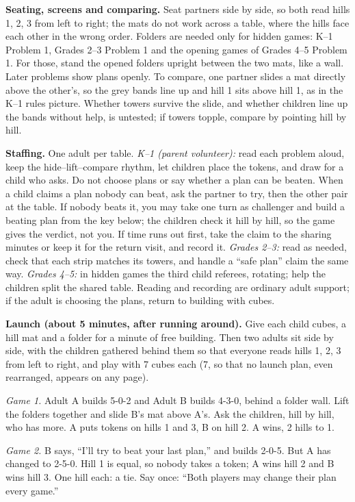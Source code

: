 \documentclass[11pt]{article}
\begin{document}
\textbf{Seating, screens and comparing.} Seat partners side by side, so both read hills 1, 2, 3 from left to right; the mats do not work across a table, where the hills face each other in the wrong order. Folders are needed only for hidden games: K--1 Problem 1, Grades 2--3 Problem 1 and the opening games of Grades 4--5 Problem 1. For those, stand the opened folders upright between the two mats, like a wall. Later problems show plans openly. To compare, one partner slides a mat directly above the other's, so the grey bands line up and hill 1 sits above hill 1, as in the K--1 rules picture. Whether towers survive the slide, and whether children line up the bands without help, is untested; if towers topple, compare by pointing hill by hill.

\textbf{Staffing.} One adult per table. \emph{K--1 (parent volunteer):} read each problem aloud, keep the hide--lift--compare rhythm, let children place the tokens, and draw for a child who asks. Do not choose plans or say whether a plan can be beaten. When a child claims a plan nobody can beat, ask the partner to try, then the other pair at the table. If nobody beats it, you may take one turn as challenger and build a beating plan from the key below; the children check it hill by hill, so the game gives the verdict, not you. If time runs out first, take the claim to the sharing minutes or keep it for the return visit, and record it. \emph{Grades 2--3:} read as needed, check that each strip matches its towers, and handle a ``safe plan'' claim the same way. \emph{Grades 4--5:} in hidden games the third child referees, rotating; help the children split the shared table. Reading and recording are ordinary adult support; if the adult is choosing the plans, return to building with cubes.

\textbf{Launch (about 5 minutes, after running around).} Give each child cubes, a hill mat and a folder for a minute of free building. Then two adults sit side by side, with the children gathered behind them so that everyone reads hills 1, 2, 3 from left to right, and play with 7 cubes each (7, so that no launch plan, even rearranged, appears on any page).

\emph{Game 1.} Adult A builds 5-0-2 and Adult B builds 4-3-0, behind a folder wall. Lift the folders together and slide B's mat above A's. Ask the children, hill by hill, who has more. A puts tokens on hills 1 and 3, B on hill 2. A wins, 2 hills to 1.

\emph{Game 2.} B says, ``I'll try to beat your last plan,'' and builds 2-0-5. But A has changed to 2-5-0. Hill 1 is equal, so nobody takes a token; A wins hill 2 and B wins hill 3. One hill each: a tie. Say once: ``Both players may change their plan every game.''
\end{document}
